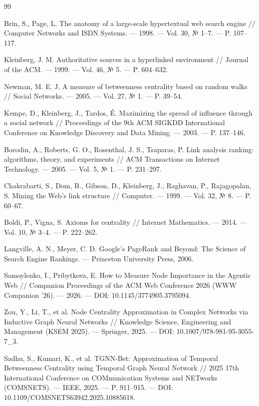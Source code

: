 \documentclass[12pt, a4paper]{article}
\begin{document}
\begin{thebibliography}{99}

 Brin, S., Page, L. The anatomy of a large-scale hypertextual web search engine // Computer Networks and ISDN Systems. — 1998. — Vol. 30, № 1–7. — P. 107–117.

 Kleinberg, J. M. Authoritative sources in a hyperlinked environment // Journal of the ACM. — 1999. — Vol. 46, № 5. — P. 604–632.

 Newman, M. E. J. A measure of betweenness centrality based on random walks // Social Networks. — 2005. — Vol. 27, № 1. — P. 39–54.

 Kempe, D., Kleinberg, J., Tardos, É. Maximizing the spread of influence through a social network // Proceedings of the 9th ACM SIGKDD International Conference on Knowledge Discovery and Data Mining. — 2003. — P. 137–146.

 Borodin, A., Roberts, G. O., Rosenthal, J. S., Tsaparas, P. Link analysis ranking: algorithms, theory, and experiments // ACM Transactions on Internet Technology. — 2005. — Vol. 5, № 1. — P. 231–297.

 Chakrabarti, S., Dom, B., Gibson, D., Kleinberg, J., Raghavan, P., Rajagopalan, S. Mining the Web's link structure // Computer. — 1999. — Vol. 32, № 8. — P. 60–67.

 Boldi, P., Vigna, S. Axioms for centrality // Internet Mathematics. — 2014. — Vol. 10, № 3–4. — P. 222–262.

 Langville, A. N., Meyer, C. D. Google's PageRank and Beyond: The Science of Search Engine Rankings. — Princeton University Press, 2006.

 Samoylenko, I., Pribytkova, E. How to Measure Node Importance in the Agentic Web // Companion Proceedings of the ACM Web Conference 2026 (WWW Companion '26). — 2026. — DOI: 10.1145/3774905.3795094.

 Zou, Y., Li, T., et al. Node Centrality Approximation in Complex Networks via Inductive Graph Neural Networks // Knowledge Science, Engineering and Management (KSEM 2025). — Springer, 2025. — DOI: 10.1007/978-981-95-3055-7\_3.

 Sadhu, S., Kumari, K., et al. TGNN-Bet: Approximation of Temporal Betweenness Centrality using Temporal Graph Neural Network // 2025 17th International Conference on COMmunication Systems and NETworks (COMSNETS). — IEEE, 2025. — P. 911–915. — DOI: 10.1109/COMSNETS63942.2025.10885618.


\end{thebibliography}
\end{document}
